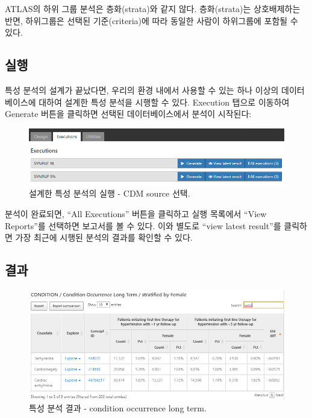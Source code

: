 \documentclass[11pt]{book}
\theoremstyle{definition}
\theoremstyle{definition}
\theoremstyle{definition}
\theoremstyle{remark}
\let\BeginKnitrBlock\begin \let\EndKnitrBlock\end
\begin{document}
\BeginKnitrBlock{rmdimportant}
ATLAS의 하위 그룹 분석은 층화(strata)와 같지 않다. 층화(strata)는
상호배제하는 반면, 하위그룹은 선택된 기준(criteria)에 따라 동일한 사람이
하위그룹에 포함될 수 있다.
\EndKnitrBlock{rmdimportant}

\subsection{실행}

특성 분석의 설계가 끝났다면, 우리의 환경 내에서 사용할 수 있는 하나
이상의 데이터베이스에 대하여 설계한 특성 분석을 시행할 수 있다.
Execution 탭으로 이동하여 Generate 버튼을 클릭하면 선택된
데이터베이스에서 분석이 시작된다:

\begin{figure}

{\centering \includegraphics[width=1\linewidth]{images/Characterization/atlasCharacterizationExecutions} 

}

\caption{설계한 특성 분석의 실행 - CDM source 선택.}\label{fig:atlasCharacterizationExecutions}
\end{figure}

분석이 완료되면, ``All Executions'' 버튼을 클릭하고 실행 목록에서 ``View
Reports''를 선택하면 보고서를 볼 수 있다. 이와 별도로 ``view latest
result''를 클릭하면 가장 최근에 시행된 분석의 결과를 확인할 수 있다.

\subsection{결과}\label{-1}

\begin{figure}

{\centering \includegraphics[width=1\linewidth]{images/Characterization/atlasCharacterizationResultsSummary} 

}

\caption{특성 분석 결과 - condition occurrence long term.}\label{fig:atlasCharacterizationResultsSummary}
\end{figure}
\end{document}
